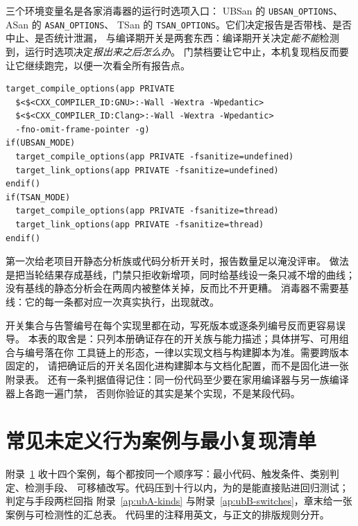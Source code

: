 \documentclass[12pt,a4paper,fontset=fandol]{ctexbook}
\newcommand{\Tp}[1]{\texttt{#1}}
\newcommand{\Bk}{\discretionary{}{}{}}
\newcommand{\Mx}[1]{\textsf{#1}}
\begin{document}
三个环境变量名是各家消毒器的运行时选项入口：
\Mx{UBSan} 的 \Tp{UBSAN{\Bk}\_OPTIONS}、\Mx{ASan} 的 \Tp{ASAN{\Bk}\_OPTIONS}、
\Mx{TSan} 的 \Tp{TSAN{\Bk}\_OPTIONS}。它们决定报告是否带栈、是否中止、是否统计泄漏，
与编译期开关是两套东西：编译期开关决定\emph{能不能}检测到，运行时选项决定\emph{报出来之后怎么办}。
门禁档要让它中止，本机复现档反而要让它继续跑完，以便一次看全所有报告点。

\begin{lstlisting}[style=cmakestyle, caption={把消毒器选项按编译器族落到目标上}]
target_compile_options(app PRIVATE
  $<$<CXX_COMPILER_ID:GNU>:-Wall -Wextra -Wpedantic>
  $<$<CXX_COMPILER_ID:Clang>:-Wall -Wextra -Wpedantic>
  -fno-omit-frame-pointer -g)
if(UBSAN_MODE)
  target_compile_options(app PRIVATE -fsanitize=undefined)
  target_link_options(app PRIVATE -fsanitize=undefined)
endif()
if(TSAN_MODE)
  target_compile_options(app PRIVATE -fsanitize=thread)
  target_link_options(app PRIVATE -fsanitize=thread)
endif()
\end{lstlisting}

\begin{bestpractice}[title=基线与噪声]
第一次给老项目开静态分析族或代码分析开关时，报告数量足以淹没评审。
做法是把当轮结果存成基线，门禁只拒收新增项，同时给基线设一条只减不增的曲线；
没有基线的静态分析会在两周内被整体关掉，反而比不开更糟。
消毒器不需要基线：它的每一条都对应一次真实执行，出现就改。
\end{bestpractice}

\begin{note}[title=为什么表里没有版本号与告警编号]
开关集合与告警编号在每个实现里都在动，写死版本或逐条列编号反而更容易误导。
本表的取舍是：只列本册确证存在的开关族与能力描述；具体拼写、可用组合与编号落在你
工具链上的形态，一律以实现文档与构建脚本为准。需要跨版本固定的，
请把确证后的开关名固化进构建脚本与文档化配置，而不是固化进一张附录表。
还有一条判据值得记住：同一份代码至少要在家用编译器与另一族编译器上各跑一遍门禁，
否则你验证的其实是某个实现，不是某段代码。
\end{note}

\chapter{常见未定义行为案例与最小复现清单}\label{ap:ubC-cases}

附录~\ref{ap:ubC-cases} 收十四个案例，每个都按同一个顺序写：最小代码、触发条件、类别判定、检测手段、
可移植改写。代码压到十行以内，为的是能直接贴进回归测试；判定与手段两栏回指
附录~\ref{ap:ubA-kinds} 与附录~\ref{ap:ubB-switches}，章末给一张案例与可检测性的汇总表。
代码里的注释用英文，与正文的排版规则分开。
\end{document}
